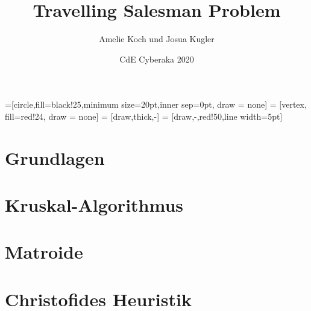 \documentclass{beamer}
\author{Amelie Koch und Josua Kugler}
\title{Travelling Salesman Problem}
\date{CdE Cyberaka 2020}
\theoremstyle{definition}
\begin{document}
=[circle,fill=black!25,minimum size=20pt,inner sep=0pt, draw = none]
 = [vertex, fill=red!24, draw = none]
 = [draw,thick,-]
 = [draw,-,red!50,line width=5pt]
\graphicspath{{images/}}
\maketitle

  \section*{Grundlagen}
  
  
  
  
  
  
  
  \section*{Kruskal-Algorithmus}
  
  
  \section*{Matroide}
  
  
  
  
  
  
  
  
  \section*{Christofides Heuristik}
  
  
  
  
  
  
  
  
\end{document}
